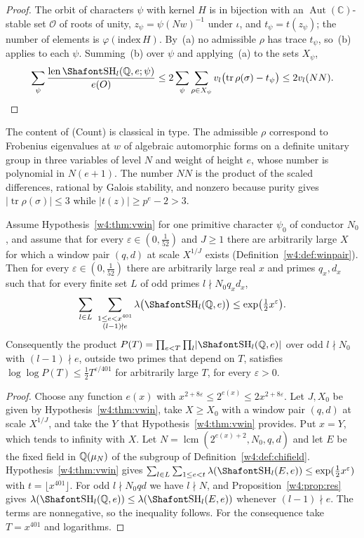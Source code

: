\begin{proof}
The orbit of characters $\psi$ with kernel $H$ is in bijection with an $\operatorname{Aut}(\mathbb C)$-stable set $\mathcal O$ of roots of unity, $z_\psi=\psi(Nw)^{-1}$ under $\iota$, and $t_\psi=t(z_\psi)$; the number of elements is $\varphi(\mathrm{index}\,H)$. By~(a) no admissible $\rho$ has trace $t_\psi$, so~(b) applies to each $\psi$. Summing~(b) over $\psi$ and applying~(a) to the sets $X_\psi$,
\[
\sum_\psi\frac{\len\Sha_l(\Q,e;\psi)}{e(O)}\le2\sum_\psi\sum_{\rho\in X_\psi}v_l\bigl(\operatorname{tr}\rho(\sigma)-t_\psi\bigr)\le2v_l(NN).\qedhere
\]
\end{proof}

The content of (Count) is classical in type. The admissible $\rho$ correspond to Frobenius eigenvalues at $w$ of algebraic automorphic forms on a definite unitary group in three variables of level $N$ and weight of height $e$, whose number is polynomial in $N(e+1)$. The number $NN$ is the product of the scaled differences, rational by Galois stability, and nonzero because purity gives $|\operatorname{tr}\rho(\sigma)|\le3$ while $|t(z)|\ge p^{e}-2>3$. 

\begin{proposition}\label{w4:prop:need}
Assume Hypothesis~\ref{w4:thm:vwin} for one primitive character $\psi_0$ of conductor $N_0$, and assume that for every $\varepsilon\in(0,\frac1{52})$ and $J\ge1$ there are arbitrarily large $X$ for which a window pair $(q,d)$ at scale $X^{1/J}$ exists (Definition~\ref{w4:def:winpair}). Then for every $\varepsilon\in(0,\frac1{52})$ there are arbitrarily large real $x$ and primes $q_x,d_x$ such that for every finite set $L$ of odd primes $l\nmid N_0q_xd_x$,
\[
\sum_{l\in L}\ \sum_{\substack{1\le e<x^{401}\\(l-1)\nmid e}}\lambda\bigl(\Sha_l(\Q,e)\bigr)\le\exp\bigl(\tfrac12x^{\varepsilon}\bigr).
\]
Consequently the product $P(T)=\prod_{e<T}\prod_{l}\lvert\Sha_l(\Q,e)\rvert$ over odd $l\nmid N_0$ with $(l-1)\nmid e$, outside two primes that depend on $T$, satisfies $\log\log P(T)\le\frac12T^{\varepsilon/401}$ for arbitrarily large $T$, for every $\varepsilon>0$.
\end{proposition}

\begin{proof}
Choose any function $e(x)$ with $x^{2+8\varepsilon}\le2^{e(x)}\le2x^{2+8\varepsilon}$. Let $J,X_0$ be given by Hypothesis~\ref{w4:thm:vwin}, take $X\ge X_0$ with a window pair $(q,d)$ at scale $X^{1/J}$, and take the $Y$ that Hypothesis~\ref{w4:thm:vwin} provides. Put $x=Y$, which tends to infinity with $X$. Let $N=\operatorname{lcm}(2^{e(x)+2},N_0,q,d)$ and let $E$ be the fixed field in $\mathbb Q(\mu_N)$ of the subgroup of Definition~\ref{w4:def:chifield}. Hypothesis~\ref{w4:thm:vwin} gives $\sum_{l\in L}\sum_{1\le e<t}\lambda(\Sha_l(E,e))\le\exp(\frac12x^\varepsilon)$ with $t=\lfloor x^{401}\rfloor$. For odd $l\nmid N_0qd$ we have $l\nmid N$, and Proposition~\ref{w4:prop:res} gives $\lambda(\Sha_l(\Q,e))\le\lambda(\Sha_l(E,e))$ whenever $(l-1)\nmid e$. The terms are nonnegative, so the inequality follows. For the consequence take $T=x^{401}$ and logarithms.
\end{proof}

